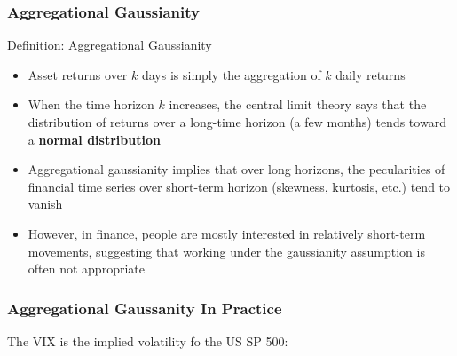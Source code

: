 \documentclass{beamer}
\begin{document}
\begin{frame}
  \frametitle{Aggregational Gaussianity}

  \begin{block}{Definition: Aggregational Gaussianity}
    \begin{itemize}
    \item Asset returns over $k$ days is simply the aggregation of $k$ daily returns
    \item When the time horizon $k$ increases, the central limit theory says that the distribution of returns over a long-time horizon (a few months) tends toward a \textbf{normal distribution}
    \end{itemize}
  \end{block}


  \begin{itemize}
  \item Aggregational gaussianity implies that over long horizons, the pecularities of financial time series over short-term horizon (skewness, kurtosis, etc.) tend to vanish
  \item However, in finance, people are mostly interested in relatively short-term movements, suggesting that working under the gaussianity assumption is often not appropriate
  \end{itemize}
  
\end{frame}


\begin{frame}
  \frametitle{Aggregational Gaussanity In Practice}
  The VIX is the implied volatility fo the US SP 500:\\ 
\end{frame}
\end{document}
